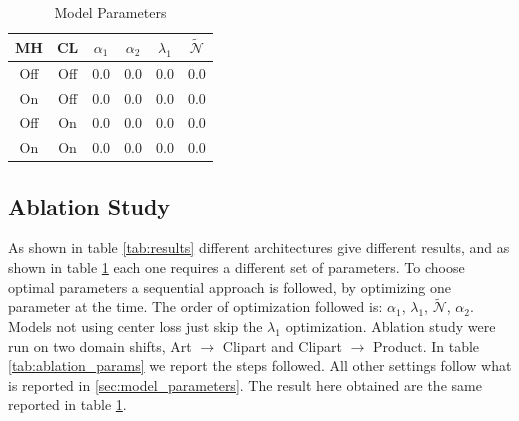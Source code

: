 \documentclass[10pt,twocolumn,letterpaper]{article}
\begin{document}
\begin{table}
  \centering
  \begin{tabular}[b]{||c|c|c|c|c|c||}
    \hline
    MH & CL & $\alpha_1$ & $\alpha_2$ & $\lambda_1$ & $\mathcal{\tilde N}$ \\
    \hline
    Off & Off & 0.0 & 0.0 & 0.0 & 0.0 \\
    On & Off & 0.0 & 0.0 & 0.0 & 0.0 \\
    Off & On & 0.0 & 0.0 & 0.0 & 0.0 \\
    On & On & 0.0 & 0.0 & 0.0 & 0.0 \\
    \hline
  \end{tabular}
  \caption{\label{tab:params}Model Parameters}
\end{table}

\subsection{Ablation Study}
\label{sec:ablation_study}
As shown in table \ref{tab:results} different architectures give different results, 
and as shown in table \ref{tab:params} each one requires a different set of parameters.
To choose optimal parameters a sequential approach is followed, 
by optimizing one parameter at the time.
The order of optimization followed is: 
$\alpha_1$, $\lambda_1$, $\mathcal{\tilde N}$, $\alpha_2$.
Models not using center loss just skip the $\lambda_1$ optimization.
Ablation study were run on two domain shifts, 
Art $\to$ Clipart and Clipart $\to$ Product.
In table \ref{tab:ablation_params} we report the steps followed.
All other settings follow what is reported in \ref{sec:model_parameters}.
The result here obtained are the same reported in table \ref{tab:params}.
\end{document}
